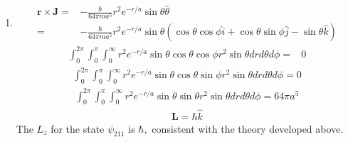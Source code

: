 \begin{enumerate}
\begin{align*}
                =&\frac{-2i}{24}a^{-3}
                \frac{r}{a^2}\exp\left(-\frac{r}{a}\right)\frac{3}{8\pi}
                \sin\theta
                \hat\phi\\
                =&\frac{-ir}{32\pi a^5}
                \exp\left(-\frac{r}{a}\right)
                \sin\theta\hat\phi
            \end{align*}
            \begin{align*}
                \bm J = 
                \frac{\hbar}{64\pi ma^5}
                re^{-r/a}\sin\theta\hat\phi
            \end{align*}
            \item 
            \begin{align*}
                \bm r\times \bm J = &
                -
                \frac{\hbar}{64\pi ma^5}
                r^2e^{-r/a}\sin\theta
                \hat\theta\\
                =&
                -
                \frac{\hbar}{64\pi ma^5}
                r^2e^{-r/a}\sin\theta
                (\cos\theta\cos\phi\hat i
                +\cos\theta\sin\phi\hat j
                -\sin\theta\hat k)
            \end{align*}
            \begin{align*}
                \int_{0}^{2\pi}
                \int_{0}^{\pi}
                \int_0^\infty r^2e^{-r/a}
                \sin\theta\cos\theta\cos\phi
                r^2\sin\theta
                drd\theta d\phi =&
                0
            \end{align*}
            \begin{align*}
                 \int_{0}^{2\pi}
                \int_{0}^{\pi}
                \int_0^\infty r^2e^{-r/a}
                \sin\theta\cos\theta\sin\phi
                r^2\sin\theta
                drd\theta d\phi = 0
            \end{align*}
            \begin{align*}
                 \int_{0}^{2\pi}
                \int_{0}^{\pi}
                \int_0^\infty r^2e^{-r/a}
                \sin\theta\sin\theta
                r^2\sin\theta
                drd\theta d\phi = 64\pi a^{5}
            \end{align*}
            \begin{align*}
                \bm L
                =
                \hbar\hat k
            \end{align*}
            The $L_z$ for the state $\psi_{211}$ is $\hbar,$ consistent with the theory developed above.
        \end{enumerate}
